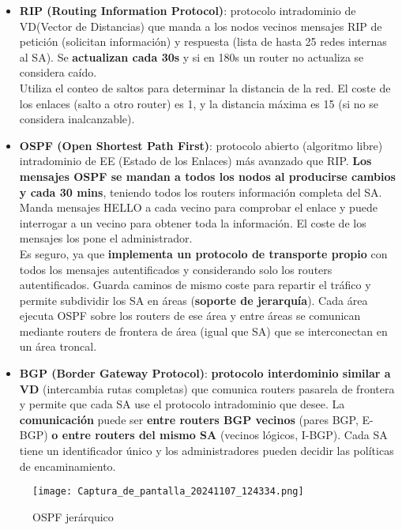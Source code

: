 \documentclass{article}
\begin{document}
\begin{itemize}
    \item \textbf{RIP (Routing Information Protocol)}: protocolo intradominio de VD(Vector de Distancias) que manda a los nodos vecinos mensajes RIP de petición (solicitan información) y respuesta (lista de hasta 25 redes internas al SA). Se \textbf{actualizan cada 30s} y si en 180s un router no actualiza se considera caído. \\
    Utiliza el conteo de saltos para determinar la distancia de la red. El coste de los enlaces (salto a otro router) es 1, y la distancia máxima es 15 (si no se considera inalcanzable).
    
    \item \textbf{OSPF (Open Shortest Path First)}: protocolo abierto (algoritmo libre) intradominio de EE (Estado de los Enlaces) más avanzado que RIP. \textbf{Los mensajes OSPF se mandan a todos los nodos al producirse cambios y cada 30 mins}, teniendo todos los routers información completa del SA. Manda mensajes HELLO a cada vecino para comprobar el enlace y puede interrogar a un vecino para obtener toda la información. El coste de los mensajes los pone el administrador. \\
    Es seguro, ya que \textbf{implementa un protocolo de transporte propio} con todos los mensajes autentificados y considerando solo los routers autentificados. Guarda caminos de mismo coste para
    repartir el tráfico y permite subdividir los SA en áreas (\textbf{soporte de jerarquía}). Cada área ejecuta OSPF sobre los routers de ese área y entre áreas se comunican mediante routers de frontera de área (igual que SA) que se interconectan en un área troncal.

    \item \textbf{BGP (Border Gateway Protocol)}: \textbf{protocolo interdominio similar a VD} (intercambia rutas completas) que comunica routers pasarela de frontera y permite que cada SA use el protocolo intradominio que desee. La \textbf{comunicación} puede ser \textbf{entre routers BGP vecinos} (pares BGP, E-BGP) \textbf{o entre routers del mismo SA} (vecinos lógicos, I-BGP). Cada SA tiene un identificador único y los administradores pueden decidir las políticas de encaminamiento.
\end{itemize}

\begin{figure}[h]
    \centering
    \texttt{[image: Captura\_de\_pantalla\_20241107\_124334.png]}
    \caption{OSPF jerárquico}
    \label{fig:etiqueta}
\end{figure}
\end{document}
